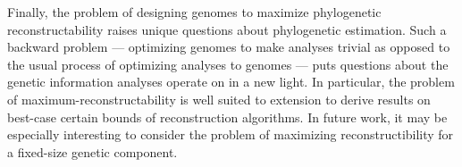 Finally, the problem of designing genomes to maximize phylogenetic reconstructability raises unique questions about phylogenetic estimation.
Such a backward problem --- optimizing genomes to make analyses trivial as opposed to the usual process of optimizing analyses to genomes --- puts questions about the genetic information analyses operate on in a new light.
In particular, the problem of maximum-reconstructability is well suited to extension to derive results on best-case certain bounds of reconstruction algorithms.
In future work, it may be especially interesting to consider the problem of maximizing reconstructibility for a fixed-size genetic component.
